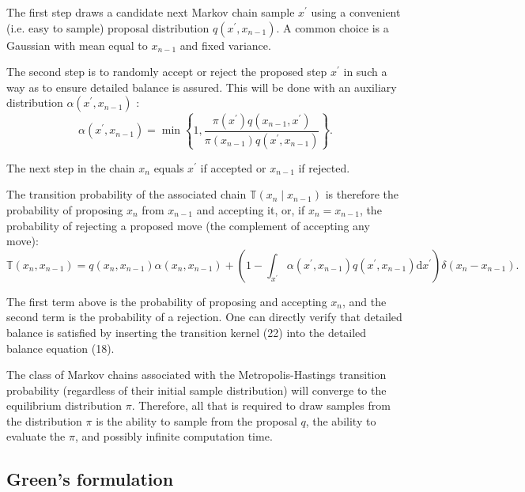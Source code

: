 \documentclass[11pt]{article}
\begin{document}
The first step draws a candidate next Markov chain sample $x^{\prime}$ using a convenient (i.e. easy to sample) proposal distribution $q\left(x^{\prime}, x_{n-1}\right)$. A common choice is a Gaussian with mean equal to $x_{n-1}$ and fixed variance.

The second step is to randomly accept or reject the proposed step $x^{\prime}$ in such a way as to ensure detailed balance is assured. This will be done with an auxiliary distribution $\alpha\left(x^{\prime}, x_{n-1}\right)$ :
\begin{equation}
\alpha\left(x^{\prime}, x_{n-1}\right)=\min \left\{1, \frac{\pi\left(x^{\prime}\right) q\left(x_{n-1}, x^{\prime}\right)}{\pi\left(x_{n-1}\right) q\left(x^{\prime}, x_{n-1}\right)}\right\} .
\end{equation}

The next step in the chain $x_{n}$ equals $x^{\prime}$ if accepted or $x_{n-1}$ if rejected.

The transition probability of the associated chain $\mathbb{T}\left(x_{n} \mid x_{n-1}\right)$ is therefore the probability of proposing $x_{n}$ from $x_{n-1}$ and accepting it, or, if $x_{n}=x_{n-1}$, the probability of rejecting a proposed move (the complement of accepting any move):
\begin{equation}
\mathbb{T}\left(x_{n}, x_{n-1}\right)=q\left(x_{n}, x_{n-1}\right) \alpha\left(x_{n}, x_{n-1}\right)+\left(1-\int_{x^{\prime}} \alpha\left(x^{\prime}, x_{n-1}\right) q\left(x^{\prime}, x_{n-1}\right) \mathrm{d} x^{\prime}\right) \delta\left(x_{n}-x_{n-1}\right) .
\end{equation}

The first term above is the probability of proposing and accepting $x_{n}$, and the second term is the probability of a rejection. One can directly verify that detailed balance is satisfied by inserting the transition kernel (22) into the detailed balance equation (18).

The class of Markov chains associated with the Metropolis-Hastings transition probability (regardless of their initial sample distribution) will converge to the equilibrium distribution $\pi$. Therefore, all that is required to draw samples from the distribution $\pi$ is the ability to sample from the proposal $q$, the ability to evaluate the $\pi$, and possibly infinite computation time.

\subsection{Green's formulation}
\end{document}
